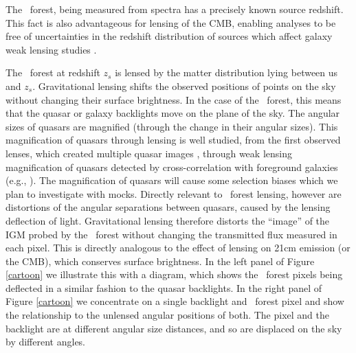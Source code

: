 The \lya\ forest, being measured from spectra has a precisely known
source redshift. This fact is also advantageous for lensing of the
CMB, enabling analyses to be free of uncertainties in the redshift
distribution of sources which affect galaxy weak lensing studies
\citep{hearin2010}.


The \lya\ forest at redshift $z_{s}$ is lensed by the matter
distribution lying between us and $z_{s}$. Gravitational lensing
shifts the observed positions of points on the sky without changing
their surface brightness.  In the case of the \lya\ forest, this means
that the quasar or galaxy backlights move on the plane of the sky.
The angular sizes of quasars are magnified (through the change in
their angular sizes). This magnification of quasars through lensing is
well studied, from the first observed lenses, which created multiple
quasar images \citep{walsh1979}, through weak lensing
magnification of quasars detected by cross-correlation with foreground
galaxies (e.g., \cite{scranton2005}).  The magnification of
quasars will cause some selection biases which we plan to investigate
with mocks. Directly relevant to \lya\ forest lensing, however
are distortions of the angular separations between quasars, caused by
the lensing deflection of light. 
  Gravitational lensing therefore distorts the ``image'' of the 
IGM probed by the \lya\ forest without
changing the transmitted flux measured in each pixel. This is directly
analogous to the effect of lensing on 21cm emission (or the CMB),
which conserves surface brightness.  In
the left panel of Figure \ref{cartoon} we
illustrate this with a diagram, which shows the \lya\ forest pixels
being deflected in a similar fashion to the quasar backlights. In
the right panel of 
Figure \ref{cartoon} we concentrate on a single backlight and \lya\
forest pixel and show the relationship to the unlensed angular
positions of both. The pixel and the backlight are at different
angular size distances, and so are displaced on the sky by different
angles.

